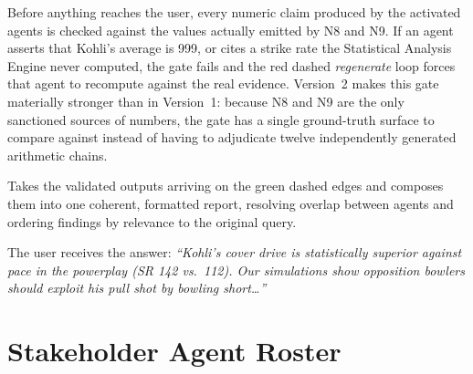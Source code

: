 \documentclass[11pt,a4paper]{article}
\begin{document}
\begin{description}[leftmargin=0em,style=nextline]
\item[Faithfulness Check (Purple Diamond).]
  Before anything reaches the user, every numeric claim produced by the activated
  agents is checked against the values actually emitted by N8 and N9. If an agent
  asserts that Kohli's average is 999, or cites a strike rate the Statistical
  Analysis Engine never computed, the gate fails and the red dashed
  \emph{regenerate} loop forces that agent to recompute against the real
  evidence. Version~2 makes this gate materially stronger than in Version~1:
  because N8 and N9 are the only sanctioned sources of numbers, the gate has a
  single ground-truth surface to compare against instead of having to adjudicate
  twelve independently generated arithmetic chains.

\item[N12 --- Supervisor LLM (Report Synthesis).]
  Takes the validated outputs arriving on the green dashed edges and composes
  them into one coherent, formatted report, resolving overlap between agents and
  ordering findings by relevance to the original query.

\item[N13 --- Final Output (Analytics Report).]
  The user receives the answer: \emph{``Kohli's cover drive is statistically
  superior against pace in the powerplay (SR 142 vs.\ 112). Our simulations show
  opposition bowlers should exploit his pull shot by bowling short\ldots''}
\end{description}

\clearpage
\section{Stakeholder Agent Roster}
\end{document}
